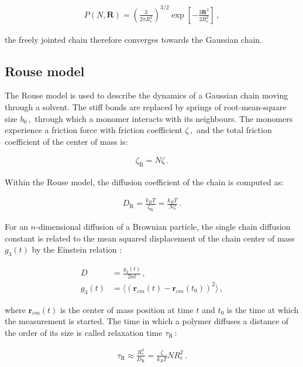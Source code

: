 \documentclass[bachelor,       %
               oneside,        %
               BCOR10mm,       %
               ngerman, english %
               ]{GAUBM}
\begin{document}
 
\begin{align}
    P(N,\mathbf R)=\left(\frac{3}{2\pi R_e^2}\right)^{3/2}\exp\left[-\frac{3\mathbf R^2}{2R_e^2}\right]\,,
\end{align}
 
 the freely jointed chain therefore converges towards the Gaussian chain. 
 
\subsection{Rouse model}

The Rouse model \cite{Rouse} is used to describe the dynamics of a Gaussian chain moving through a solvent. The stiff bonds are replaced by springs of root-mean-square size $b_0\,,$ through which a monomer interacts with its neighbours. The monomers experience a friction force with friction coefficient  $\zeta\,,$ and the total friction coefficient of the center of mass is:

\begin{align}
    \zeta_\mathrm R=N\zeta\,.
\end{align}

Within the Rouse model, the diffusion coefficient of the chain is computed as:

\begin{align}
    D_\mathrm R=\frac{k_BT}{\zeta_\mathrm R}=\frac{k_BT}{N\zeta}\,.
    \label{eq:d_rouse}
\end{align}

For an $n$-dimensional diffusion of a Brownian particle, the single chain diffusion constant is related to the mean squared displacement of the chain center of mass $g_3(t)$ by the Einstein relation \cite{einstein_1905}:

\begin{align}
    D&=\frac{g_3(t)}{2nt}\,, \label{eq:einstein_relation}\\
    g_3(t)&=\langle (\mathbf r_{cm}(t)-\mathbf r_{cm}(t_0))^2\rangle\,,\nonumber
\end{align}

where $\mathbf r_{cm}(t)$ is the center of mass position at time $t$ and $t_0$ is the time at which the measurement is started. The time in which a polymer diffuses a distance of the order of its size is called relaxation time $\tau_\mathrm R\,$:

\begin{align}
    \tau_\mathrm R\approx\frac{R_e^2}{D_\mathrm R}=\frac{\zeta}{k_BT}{NR_e^2}\,.
\end{align}
\end{document}
